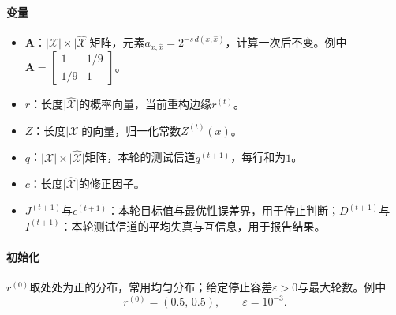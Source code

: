 \paragraph{变量}
\begin{itemize}
  \item $\bm{A}$：$\lvert\mathcal{X}\rvert\times\lvert\hat{\mathcal{X}}\rvert$矩阵，元素$a_{x,\hat{x}}=2^{-s\,d(x,\hat{x})}$，计算一次后不变。例中$\bm{A}=\begin{bmatrix}1&1/9\\1/9&1\end{bmatrix}$。
  \item $r$：长度$\lvert\hat{\mathcal{X}}\rvert$的概率向量，当前重构边缘$r^{(t)}$。
  \item $Z$：长度$\lvert\mathcal{X}\rvert$的向量，归一化常数$Z^{(t)}(x)$。
  \item $q$：$\lvert\mathcal{X}\rvert\times\lvert\hat{\mathcal{X}}\rvert$矩阵，本轮的测试信道$q^{(t+1)}$，每行和为$1$。
  \item $c$：长度$\lvert\hat{\mathcal{X}}\rvert$的修正因子。
  \item $J^{(t+1)}$与$\epsilon^{(t+1)}$：本轮目标值与最优性误差界，用于停止判断；$D^{(t+1)}$与$I^{(t+1)}$：本轮测试信道的平均失真与互信息，用于报告结果。
\end{itemize}

\paragraph{初始化}
$r^{(0)}$取处处为正的分布，常用均匀分布；给定停止容差$\varepsilon>0$与最大轮数。例中
\[
  r^{(0)}=(0.5,\,0.5),\qquad \varepsilon=10^{-3}.
\]

